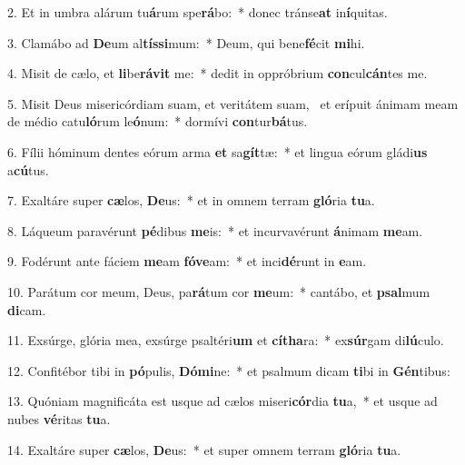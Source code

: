 2. Et in umbra alárum tu\textbf{á}rum spe\textbf{rá}bo:~*  donec tránse\textbf{at} in\textbf{í}quitas.\

3. Clamábo ad \textbf{De}um al\textbf{tís}\textbf{si}mum:~*  Deum, qui bene\textbf{fé}cit \textbf{mi}hi.\

4. Misit de cælo, et \textbf{li}be\textbf{rá}\textbf{vit} me:~*  dedit in oppróbrium \textbf{con}cul\textbf{cán}tes me.\

5. Misit Deus misericórdiam suam, et veritátem suam, \dag\  et erípuit ánimam meam de médio catu\textbf{ló}rum le\textbf{ó}num:~*  dormívi \textbf{con}tur\textbf{bá}tus.\

6. Fílii hóminum dentes eórum arma \textbf{et} sa\textbf{gít}tæ:~*  et lingua eórum gládi\textbf{us} a\textbf{cú}tus.\

7. Exaltáre super \textbf{cæ}los, \textbf{De}us:~*  et in omnem terram \textbf{gló}ria \textbf{tu}a.\

8. Láqueum paravérunt \textbf{pé}dibus \textbf{me}is:~*  et incurvavérunt \textbf{á}nimam \textbf{me}am.\

9. Fodérunt ante fáciem \textbf{me}am \textbf{fó}\textbf{ve}am:~*  et inci\textbf{dé}runt in \textbf{e}am.\

10. Parátum cor meum, Deus, pa\textbf{rá}tum cor \textbf{me}um:~*  cantábo, et \textbf{psal}mum \textbf{di}cam.\

11. Exsúrge, glória mea, exsúrge psaltéri\textbf{um} et \textbf{cí}\textbf{tha}ra:~*  ex\textbf{súr}gam di\textbf{lú}culo.\

12. Confitébor tibi in \textbf{pó}pulis, \textbf{Dó}\textbf{mi}ne:~*  et psalmum dicam \textbf{ti}bi in \textbf{Gén}tibus:\

13. Quóniam magnificáta est usque ad cælos miseri\textbf{cór}dia \textbf{tu}a,~*  et usque ad nubes \textbf{vé}ritas \textbf{tu}a.\

14. Exaltáre super \textbf{cæ}los, \textbf{De}us:~*  et super omnem terram \textbf{gló}ria \textbf{tu}a.\

